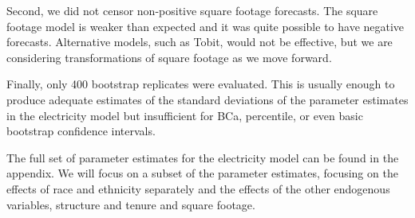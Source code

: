 \documentclass{article}
\begin{document}
Second, we did not censor non-positive square footage forecasts.  The square footage model is weaker than expected and it was quite possible to have negative forecasts.  Alternative models, such as Tobit, would not be effective, but we are considering transformations of square footage as we move forward.  

Finally, only 400 bootstrap replicates were evaluated.  This is usually enough to produce adequate estimates of the standard deviations of the parameter estimates in the electricity model but insufficient for BCa, percentile, or even basic bootstrap confidence intervals. 





The full set of parameter estimates for the electricity model can be found in the appendix.  We will focus on a subset of the parameter estimates, focusing on the effects of race and ethnicity separately and the effects of the other endogenous variables, structure and tenure and square footage.
\end{document}
